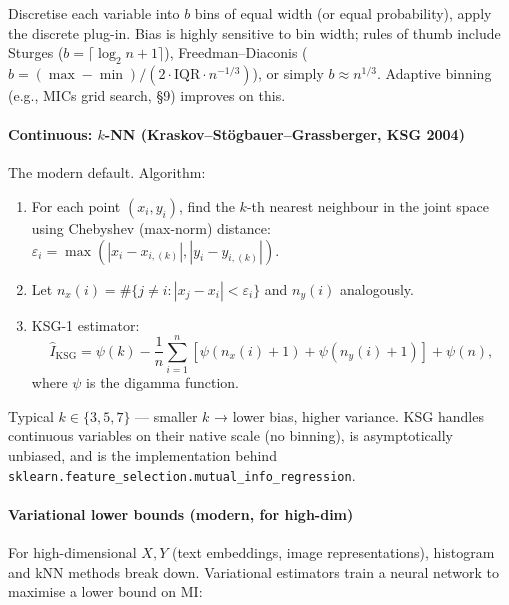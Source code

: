 \documentclass{article}
\providecommand{\tightlist}{\setlength{\itemsep}{0pt}\setlength{\parskip}{0pt}}
\begin{document}
Discretise each variable into \(b\) bins of equal width (or equal
probability), apply the discrete plug-in. Bias is highly sensitive to
bin width; rules of thumb include Sturges\textquotesingle{}
(\(b = \lceil \log_2 n + 1 \rceil\)), Freedman--Diaconis
(\(b = (\max - \min) / (2 \cdot \mathrm{IQR} \cdot n^{-1/3})\)), or
simply \(b \approx n^{1/3}\). Adaptive binning (e.g.,
MIC\textquotesingle s grid search, §9) improves on this.

\paragraph{\texorpdfstring{Continuous: \(k\)-NN
(Kraskov--Stögbauer--Grassberger, KSG
2004)}{Continuous: k-NN (Kraskov--Stögbauer--Grassberger, KSG 2004)}}\label{continuous-k-nn-kraskovstuxf6gbauergrassberger-ksg-2004}

The modern default. Algorithm:

\begin{enumerate}
\def\labelenumi{\arabic{enumi}.}
\tightlist
\item
  For each point \((x_i, y_i)\), find the \(k\)-th nearest neighbour in
  the joint space using Chebyshev (max-norm) distance:
  \(\varepsilon_i = \max(|x_i - x_{i,(k)}|, |y_i - y_{i,(k)}|)\).
\item
  Let \(n_x(i) = \#\{j \neq i : |x_j - x_i| < \varepsilon_i\}\) and
  \(n_y(i)\) analogously.
\item
  KSG-1 estimator: \[
  \hat{I}_{\text{KSG}} = \psi(k) - \frac{1}{n}\sum_{i=1}^{n}[\psi(n_x(i) + 1) + \psi(n_y(i) + 1)] + \psi(n),
  \] where \(\psi\) is the digamma function.
\end{enumerate}

Typical \(k \in \{3, 5, 7\}\) --- smaller \(k\) → lower bias, higher
variance. KSG handles continuous variables on their native scale (no
binning), is asymptotically unbiased, and is the implementation behind
\texttt{sklearn.feature\_selection.mutual\_info\_regression}.

\paragraph{Variational lower bounds (modern, for
high-dim)}\label{variational-lower-bounds-modern-for-high-dim}

For high-dimensional \(X, Y\) (text embeddings, image representations),
histogram and kNN methods break down. Variational estimators train a
neural network to maximise a lower bound on MI:
\end{document}
